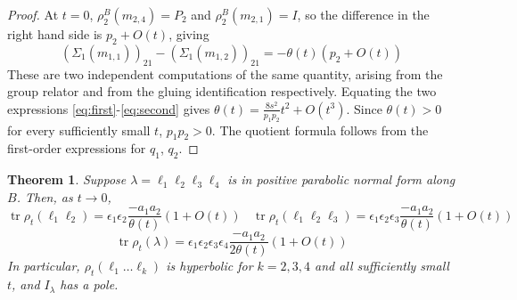 \documentclass{article}
\DeclareMathOperator{\tr}{tr}
\theoremstyle{plain}
\newtheorem{theorem}{Theorem}[section]
\theoremstyle{definition}
\theoremstyle{plain}
\theoremstyle{plain}
\theoremstyle{plain}
\theoremstyle{remark}
\theoremstyle{remark}
\theoremstyle{plain}
\theoremstyle{plain}
\theoremstyle{plain}
\theoremstyle{plain}
\begin{document}
\begin{proof}
At $t = 0$, $\rho_2^B(m_{2, 4}) = P_2$ and $\rho_2^B(m_{2, 1}) = I$, so the difference in the right hand side is $p_2 + O(t)$, giving
\begin{equation}\label{eq:second}
	(\Sigma_1(m_{1,1}))_{21} - (\Sigma_1(m_{1,2}))_{21} = -\theta(t)(p_2 + O(t))
\end{equation}
These are two independent computations of the same quantity, arising from the group relator and from the gluing identification respectively. Equating the two expressions \eqref{eq:first}-\eqref{eq:second} gives $\theta(t) = \frac{8s^2}{p_1p_2}t^2 + O(t^3)$. Since $\theta(t) > 0$ for every sufficiently small $t$, $p_1p_2 > 0$. The quotient formula follows from the first-order expressions for $q_1$, $q_2$. 
\end{proof}

\begin{theorem}\label{thm:staggeredtraces}
Suppose $\lambda=\ell_1\ell_2\ell_3\ell_4$ is in positive parabolic normal form along $B$. Then, as $t \to 0$,
\begin{equation*}
	\tr\rho_t(\ell_1\ell_2) = \epsilon_1\epsilon_2\frac{-a_1a_2}{\theta(t)}(1 + O(t)) \ \ \ \ \tr\rho_t(\ell_1\ell_2\ell_3) = \epsilon_1\epsilon_2\epsilon_3\frac{-a_1a_2}{\theta(t)}(1 + O(t))
\end{equation*}
\begin{equation*}
	\tr\rho_t(\lambda) = \epsilon_1\epsilon_2\epsilon_3\epsilon_4\frac{-a_1a_2}{2\theta(t)}(1 + O(t))
\end{equation*}
In particular, $\rho_t(\ell_1\dots\ell_k)$ is hyperbolic for $k = 2, 3, 4$ and all sufficiently small $t$, and $I_\lambda$ has a pole. 
\end{theorem}
\end{document}
